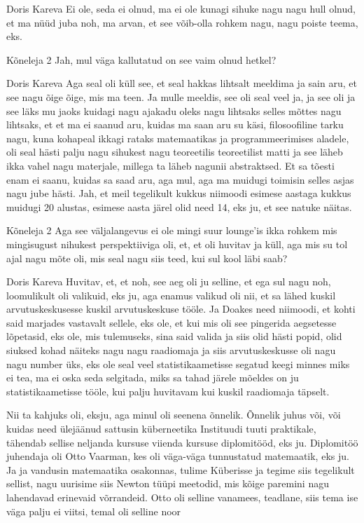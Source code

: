 Doris Kareva
Ei ole, seda ei olnud, ma ei ole kunagi sihuke nagu nagu hull olnud, et ma nüüd juba noh, ma arvan, et see võib-olla rohkem nagu, nagu poiste teema, eks. 

Kõneleja 2
Jah, mul väga kallutatud on see vaim olnud hetkel? 

Doris Kareva
Aga seal oli küll see, et seal hakkas lihtsalt meeldima ja sain aru, et see nagu õige õige, mis ma teen. Ja mulle meeldis, see oli seal veel ja, ja see oli ja see läks mu jaoks kuidagi nagu ajakadu oleks nagu lihtsaks selles mõttes nagu lihtsaks, et et ma ei saanud aru, kuidas ma saan aru su käsi, filosoofiline tarku nagu, kuna kohapeal ikkagi rataks matemaatikas ja programmeerimises aladele, oli seal hästi palju nagu sihukest nagu teoreetilis teoreetilist matti ja see läheb ikka vahel nagu materjale, millega ta läheb nagunii abstraktsed. Et sa tõesti enam ei saanu, kuidas sa saad aru, aga mul, aga ma muidugi toimisin selles asjas nagu jube hästi. Jah, et meil tegelikult kukkus niimoodi esimese aastaga kukkus muidugi 20 alustas, esimese aasta järel olid need 14, eks ju, et see natuke näitas. 

Kõneleja 2
Aga see väljalangevus ei ole mingi suur lounge'is ikka rohkem mis mingisugust nihukest perspektiiviga oli, et, et oli huvitav ja küll, aga mis su tol ajal nagu mõte oli, mis seal nagu siis teed, kui sul kool läbi saab? 

Doris Kareva
Huvitav, et, et noh, see aeg oli ju selline, et ega sul nagu noh, loomulikult oli valikuid, eks ju, aga enamus valikud oli nii, et sa lähed kuskil arvutuskeskusesse kuskil arvutuskeskuse tööle. Ja Doakes need niimoodi, et kohti said marjades vastavalt sellele, eks ole, et kui mis oli see pingerida aegsetesse lõpetasid, eks ole, mis tulemuseks, sina said valida ja siis olid hästi popid, olid siuksed kohad näiteks nagu nagu raadiomaja ja siis arvutuskeskusse oli nagu nagu number üks, eks ole seal veel statistikaametisse segatud keegi minnes miks ei tea, ma ei oska seda selgitada, miks sa tahad järele mõeldes on ju statistikaametisse tööle, kui palju huvitavam kui kuskil raadiomaja täpselt. 

Nii ta kahjuks oli, eksju, aga minul oli seenena õnnelik. Õnnelik juhus või, või kuidas need ülejäänud sattusin küberneetika Instituudi tuuti praktikale, tähendab sellise neljanda kursuse viienda kursuse diplomitööd, eks ju. Diplomitöö juhendaja oli Otto Vaarman, kes oli väga-väga tunnustatud matemaatik, eks ju. Ja ja vandusin matemaatika osakonnas, tulime Küberisse ja tegime siis tegelikult sellist, nagu uurisime siis Newton tüüpi meetodid, mis kõige paremini nagu lahendavad erinevaid võrrandeid. Otto oli selline vanamees, teadlane, siis tema ise väga palju ei viitsi, temal oli selline noor 

